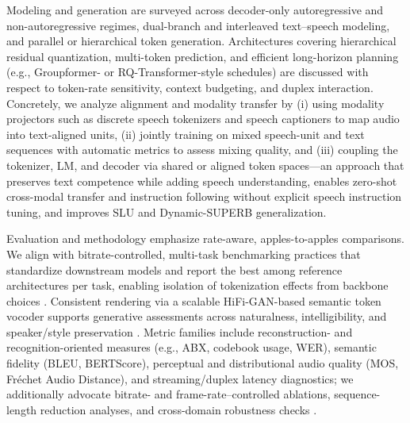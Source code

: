 Modeling and generation are surveyed across decoder-only autoregressive and non-autoregressive regimes, dual-branch and interleaved text–speech modeling, and parallel or hierarchical token generation. Architectures covering hierarchical residual quantization, multi-token prediction, and efficient long-horizon planning (e.g., Groupformer- or RQ-Transformer-style schedules) are discussed with respect to token-rate sensitivity, context budgeting, and duplex interaction. Concretely, we analyze alignment and modality transfer by (i) using modality projectors such as discrete speech tokenizers and speech captioners to map audio into text-aligned units, (ii) jointly training on mixed speech-unit and text sequences with automatic metrics to assess mixing quality, and (iii) coupling the tokenizer, LM, and decoder via shared or aligned token spaces—an approach that preserves text competence while adding speech understanding, enables zero-shot cross-modal transfer and instruction following without explicit speech instruction tuning, and improves SLU and Dynamic-SUPERB generalization. \cite{lu2024destaenhancingspeechlanguagemodelsthroug,entry2025towardjointlanguagemodelingspeechunitste}



Evaluation and methodology emphasize rate-aware, apples-to-apples comparisons. We align with bitrate-controlled, multi-task benchmarking practices that standardize downstream models and report the best among reference architectures per task, enabling isolation of tokenization effects from backbone choices \cite{mousavi2024dasbdiscreteaudiospeechbenchmark}. Consistent rendering via a scalable HiFi-GAN-based semantic token vocoder supports generative assessments across naturalness, intelligibility, and speaker/style preservation \cite{mousavi2024dasbdiscreteaudiospeechbenchmark}. Metric families include reconstruction- and recognition-oriented measures (e.g., ABX, codebook usage, WER), semantic fidelity (BLEU, BERTScore), perceptual and distributional audio quality (MOS, Fréchet Audio Distance), and streaming/duplex latency diagnostics; we additionally advocate bitrate- and frame-rate–controlled ablations, sequence-length reduction analyses, and cross-domain robustness checks .



